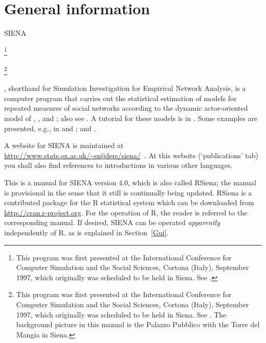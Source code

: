 \documentclass[a4paper,fleqn]{article}
\newcommand{\+}{\, + \,}
\newcommand{\R}{{\sf R }}
\newcommand{\Rn}{{\sf R}}
\newcommand{\rs}{{\sf RSiena}}
\newcommand{\RS}{{\sf RSiena }}
\newcommand{\SI}{{\sf SIENA }}
\newcommand{\si}{{\sf SIENA}}
\begin{document}
\begin{print}
\vfill
\newpage
\tableofcontents
\newpage
\end{print}

\begin{screen}
\vfill
\sloppy
\end{screen}


\begin{print}
\makeatletter
\def\@linkcolor{lc}
\makeatother
\end{print}

\section{General information}


\si
\begin{print}
\footnote{This program was first presented at the
International Conference for Computer Simulation and the Social
Sciences, Cortona (Italy), September 1997, which originally was
scheduled to be held in Siena. See \citet{SnijdersDuijn97}.}
\end{print}
\begin{screen}
\footnote{This program was first presented
at the International Conference for Computer Simulation and the
Social Sciences, Cortona (Italy), September 1997, which originally
was scheduled to be held in Siena. See \citet{SnijdersDuijn97} .
The background picture in this manual is the Palazzo Pubblico with
the Torre del Mangia in Siena.}
\end{screen}
$\!\!\!$, shorthand for {\sf Simulation Investigation for Empirical
Network Analysis}, is a computer program that carries out the
statistical estimation of models for repeated measures of social
networks according to the dynamic actor-oriented model of \citet{SnijdersDuijn97}, \citet{Snijders01}, and
\citet*{SnijdersEA07}; also see
\citet*{SteglichEA10}.
A tutorial for these models is in \citet*{SnijdersEA10b}.
Some examples are
presented, e.g., in \citet*{vanBunt99, vanBuntEA99} and \citet*{vanDuijnEA03};
and \citet*{SteglichEA06}.

A website for \SI is maintained at \url{http://www.stats.ox.ac.uk/~snijders/siena/}~.
At this website (`publications' tab)
you shall also find references to introductions in various other languages.

This is a manual for \SI version 4.0,
which is also called \rs; the manual is provisional in the sense
that it still is continually being updated.
\RS is a contributed package for the \R statistical system
which can be downloaded from\\
\url{http://cran.r-project.org}. For the operation of \Rn,
the reader is referred
to the corresponding manual. If desired, \SI can be operated \emph{apparently}
independently of \Rn, as is explained in Section~\ref{Gui}.
\end{document}
